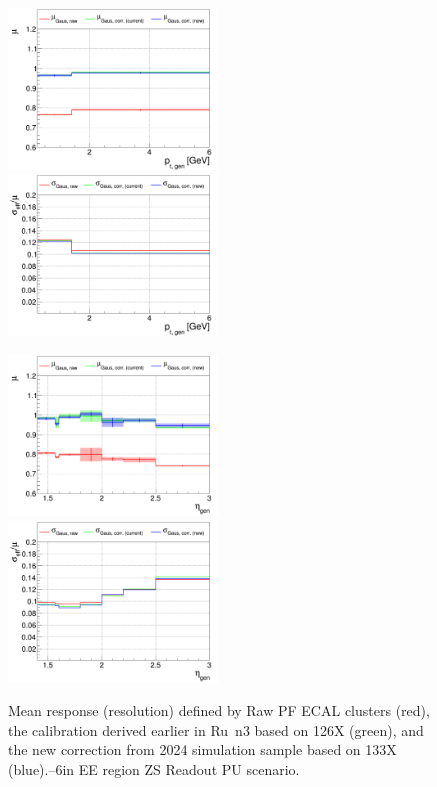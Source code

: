 \begin{figure}
\includegraphics[width=0.495\textwidth]{./plots_pdf/ECAL_plots/plotsPU/EE/ZS/pdf/GENPT/EEZS_GENPT_0000_0006_MuOverBins.pdf}
\includegraphics[width=0.495\textwidth]{./plots_pdf/ECAL_plots/plotsPU/EE/ZS/pdf/GENPT/EEZS_GENPT_0000_0006_EffSigmaOverBins.pdf}

\includegraphics[width=0.495\textwidth]{./plots_pdf/ECAL_plots/plotsPU/EE/ZS/pdf/GENETA/EEZS_GENETA_0000_0006_MuOverBins.pdf}
\includegraphics[width=0.495\textwidth]{./plots_pdf/ECAL_plots/plotsPU/EE/ZS/pdf/GENETA/EEZS_GENETA_0000_0006_EffSigmaOverBins.pdf}

\caption[$\mu$ ($\sigma_\mathrm{eff}$) vs \pt of PF ECAL cluster - EE ZS readout PU scenario]{Mean response (resolution) defined by Raw PF ECAL clusters (red), the calibration derived earlier in Ru\
n3 based on 126X (green), and the new correction from 2024 simulation sample based on 133X (blue).--6\GeV in EE region ZS Readout PU scenario.}
\label{fig:PU_EEZS}
\end{figure}

